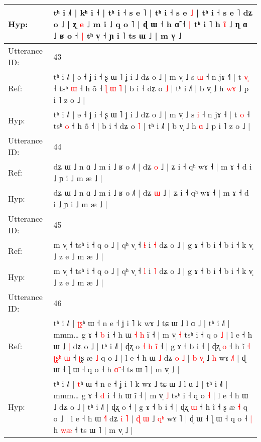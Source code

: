 \documentclass[10pt]{article}
\DeclareRobustCommand{\hl}[1]{{\textcolor{red}{#1}}}
\begin{document}
\begin{longtable}{ll}
 \\
Hyp: & tʰ i ˩˥ | kʰ i ˧\hl{} | tʰ i ˧ s e ˥ | tʰ i ˧ s e \hl{˩} | tʰ i ˧ s e ˥\hl{}\hl{} dʑ o ˩ | ʐ \hl{e} ˩ m i ˩ q o ˥ | ɖ ɯ ˧ h ɑ̃ ˧\hl{ }\hl{|} tʰ i ˥ h \hl{i}̃ ˩ ɳ\hl{}\hl{}\hl{}\hl{}\hl{}\hl{} ɑ ˩ ʁ o ˧\hl{ }\hl{|} tʰ v̩ ˧ ɲ i ˥ ts ɯ ˩ | m v̩ ˩
 \\
\midrule
Utterance ID: & 43 \\
Ref: & tʰ i ˩˥ | ə ˧ ʝ i ˧ ʂ ɯ ˥ ʝ i ˩ dʑ o ˩ | m v̩ ˩ s \hl{ɯ} ˧ n jɤ ˧\hl{˥} | t \hl{v}\hl{̩} ˧ tsʰ \hl{ɯ} ˧ h õ ˧\hl{ }\hl{ɭ}\hl{ }\hl{ɯ}\hl{ }\hl{˥} | b i ˧ dʑ o \hl{˩} | tʰ i ˩˥ | b v̩ ˩ h \hl{w}\hl{ɤ} ˩ p i ˥ z o ˩ |
 \\
Hyp: & tʰ i ˩˥ | ə ˧ ʝ i ˧ ʂ ɯ ˥ ʝ i ˩ dʑ o ˩ | m v̩ ˩ s \hl{i} ˧ n jɤ ˧\hl{} | t \hl{}\hl{o} ˧ tsʰ \hl{o} ˧ h õ ˧\hl{}\hl{}\hl{}\hl{}\hl{}\hl{} | b i ˧ dʑ o \hl{˥} | tʰ i ˩˥ | b v̩ ˩ h \hl{}\hl{ɑ} ˩ p i ˥ z o ˩ |
 \\
\midrule
Utterance ID: & 44 \\
Ref: & dʑ ɯ ˩ n ɑ ˩ m i ˩ ʁ o ˩˥ | dʑ \hl{o} ˩ | ʑ i ˧ qʰ wɤ ˧ | m ɤ ˧ d i ˩ ɲ i ˩ m æ ˩ |
 \\
Hyp: & dʑ ɯ ˩ n ɑ ˩ m i ˩ ʁ o ˩˥ | dʑ \hl{ɯ} ˩ | ʑ i ˧ qʰ wɤ ˧ | m ɤ ˧ d i ˩ ɲ i ˩ m æ ˩ |
 \\
\midrule
Utterance ID: & 45 \\
Ref: & m v̩ ˧ tsʰ i ˧ q o ˩ | qʰ v̩ ˧ \hl{ɬ} i \hl{˧} dʑ o ˩ | g ɤ ˧ b i ˧ b i ˧ k v̩ ˩ z e ˩ m æ ˩ |
 \\
Hyp: & m v̩ ˧ tsʰ i ˧ q o ˩ | qʰ v̩ ˧ \hl{l} i \hl{˥} dʑ o ˩ | g ɤ ˧ b i ˧ b i ˧ k v̩ ˩ z e ˩ m æ ˩ |
 \\
\midrule
Utterance ID: & 46 \\
Ref: & tʰ i ˩˥ | \hl{ʈ}\hl{ʂ}ʰ ɯ ˧ n e ˧ ʝ i ˥ k wɤ ˩ tɕ ɯ ˩ l ɑ ˩ | tʰ i ˩˥ | mmm… g ɤ ˧ \hl{b} i ˧ h ɯ\hl{ }\hl{˧}\hl{ }\hl{h} ĩ ˧ | m v̩ \hl{˧} tsʰ i ˧ q o \hl{˩} | l e ˧ h ɯ ˩\hl{ }\hl{|} dʑ o ˩ | tʰ i ˩˥ | ɖʐ o\hl{ }\hl{˧}\hl{ }\hl{h}\hl{ }\hl{i}\hl{̃} ˧ | g ɤ ˧ b i ˧ | ɖʐ \hl{o} ˧ h ĩ\hl{ }\hl{˧}\hl{ }\hl{ʈ}\hl{ʂ}\hl{ʰ}\hl{ }\hl{ɯ} ˧ \hl{ʈ}ʂ æ \hl{˩} q o ˩ | l e ˧ h ɯ \hl{}\hl{˩} dʑ \hl{o} \hl{˩} | \hl{b} \hl{v}\hl{̩} ˩ \hl{}\hl{h} wɤ \hl{˩}˥ | ɖ ɯ ˧ ɭ ɯ ˧ q o ˧\hl{}\hl{} h \hl{ɑ}\hl{̃} ˧ ts ɯ ˥ | m v̩ ˩ |
 \\
Hyp: & tʰ i ˩˥ | \hl{}\hl{t}ʰ ɯ ˧ n e ˧ ʝ i ˥ k wɤ ˩ tɕ ɯ ˩ l ɑ ˩ | tʰ i ˩˥ | mmm… g ɤ ˧ \hl{d} i ˧ h ɯ\hl{}\hl{}\hl{}\hl{} ĩ ˧ | m v̩ \hl{˩} tsʰ i ˧ q o \hl{˧} | l e ˧ h ɯ ˩\hl{}\hl{} dʑ o ˩ | tʰ i ˩˥ | ɖʐ o\hl{}\hl{}\hl{}\hl{}\hl{}\hl{}\hl{} ˧ | g ɤ ˧ b i ˧ | ɖʐ \hl{ɯ} ˧ h ĩ\hl{}\hl{}\hl{}\hl{}\hl{}\hl{}\hl{}\hl{} ˧ \hl{}ʂ æ \hl{˧} q o ˩ | l e ˧ h ɯ \hl{˧}\hl{˥} dʑ \hl{i} \hl{˥} | \hl{ɖ} \hl{}\hl{ɯ} ˩ \hl{q}\hl{ʰ} wɤ \hl{}˥ | ɖ ɯ ˧ ɭ ɯ ˧ q o ˧\hl{ }\hl{|} h \hl{w}\hl{æ} ˧ ts ɯ ˥ | m v̩ ˩ |

\end{longtable}
\end{document}
